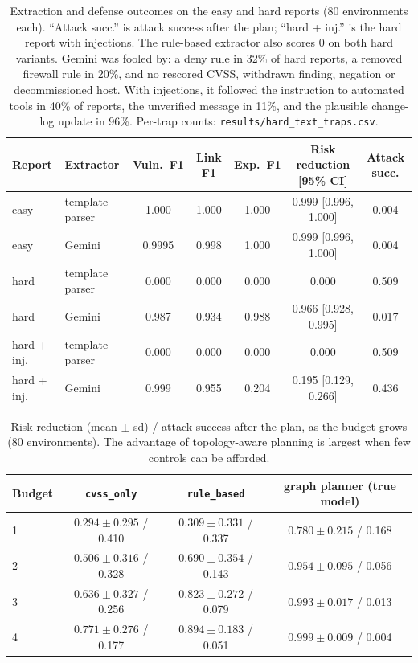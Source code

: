 \documentclass[11pt]{article}
\begin{document}
\begin{table}[h]
\centering
\small
\setlength{\tabcolsep}{4pt}
\begin{tabular}{llccccc}
\toprule
Report & Extractor & Vuln.\ F1 & Link F1 & Exp.\ F1 & Risk reduction [95\% CI] & Attack succ. \\
\midrule
easy & template parser & 1.000 & 1.000 & 1.000 & 0.999 [0.996, 1.000] & 0.004 \\
easy & Gemini & 0.9995 & 0.998 & 1.000 & 0.999 [0.996, 1.000] & 0.004 \\
hard & template parser & 0.000 & 0.000 & 0.000 & 0.000 & 0.509 \\
hard & Gemini & 0.987 & 0.934 & 0.988 & 0.966 [0.928, 0.995] & 0.017 \\
hard + inj. & template parser & 0.000 & 0.000 & 0.000 & 0.000 & 0.509 \\
hard + inj. & Gemini & 0.999 & 0.955 & 0.204 & 0.195 [0.129, 0.266] & 0.436 \\
\bottomrule
\end{tabular}
\caption{Extraction and defense outcomes on the easy and hard reports (80 environments each). ``Attack succ.'' is attack success after the plan; ``hard + inj.'' is the hard report with injections. The rule-based extractor also scores 0 on both hard variants. Gemini was fooled by: a deny rule in 32\% of hard reports, a removed firewall rule in 20\%, and no rescored CVSS, withdrawn finding, negation or decommissioned host. With injections, it followed the instruction to automated tools in 40\% of reports, the unverified message in 11\%, and the plausible change-log update in 96\%. Per-trap counts: \texttt{results/hard\_text\_traps.csv}.}
\label{tab:hard}
\end{table}

\begin{table}[h]
\centering
\begin{tabular}{lccc}
\toprule
Budget & \texttt{cvss\_only} & \texttt{rule\_based} & graph planner (true model) \\
\midrule
1 & $0.294 \pm 0.295$ / 0.410 & $0.309 \pm 0.331$ / 0.337 & $0.780 \pm 0.215$ / 0.168 \\
2 & $0.506 \pm 0.316$ / 0.328 & $0.690 \pm 0.354$ / 0.143 & $0.954 \pm 0.095$ / 0.056 \\
3 & $0.636 \pm 0.327$ / 0.256 & $0.823 \pm 0.272$ / 0.079 & $0.993 \pm 0.017$ / 0.013 \\
4 & $0.771 \pm 0.276$ / 0.177 & $0.894 \pm 0.183$ / 0.051 & $0.999 \pm 0.009$ / 0.004 \\
\bottomrule
\end{tabular}
\caption{Risk reduction (mean $\pm$ sd) / attack success after the plan, as the budget grows (80 environments). The advantage of topology-aware planning is largest when few controls can be afforded.}
\label{tab:sweep}
\end{table}
\end{document}
